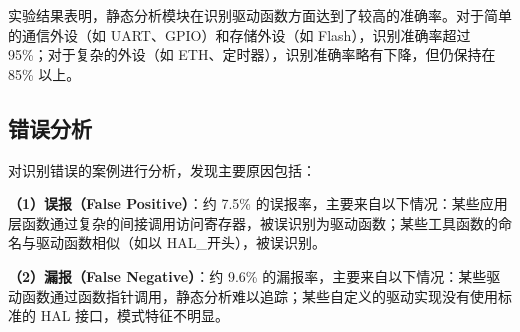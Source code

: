 实验结果表明，静态分析模块在识别驱动函数方面达到了较高的准确率。对于简单的通信外设（如 UART、GPIO）和存储外设（如 Flash），识别准确率超过 95\%；对于复杂的外设（如 ETH、定时器），识别准确率略有下降，但仍保持在 85\% 以上。

\subsection{错误分析}

对识别错误的案例进行分析，发现主要原因包括：

\textbf{（1）误报（False Positive）}：约 7.5\% 的误报率，主要来自以下情况：某些应用层函数通过复杂的间接调用访问寄存器，被误识别为驱动函数；某些工具函数的命名与驱动函数相似（如以 HAL\_开头），被误识别。

\textbf{（2）漏报（False Negative）}：约 9.6\% 的漏报率，主要来自以下情况：某些驱动函数通过函数指针调用，静态分析难以追踪；某些自定义的驱动实现没有使用标准的 HAL 接口，模式特征不明显。
